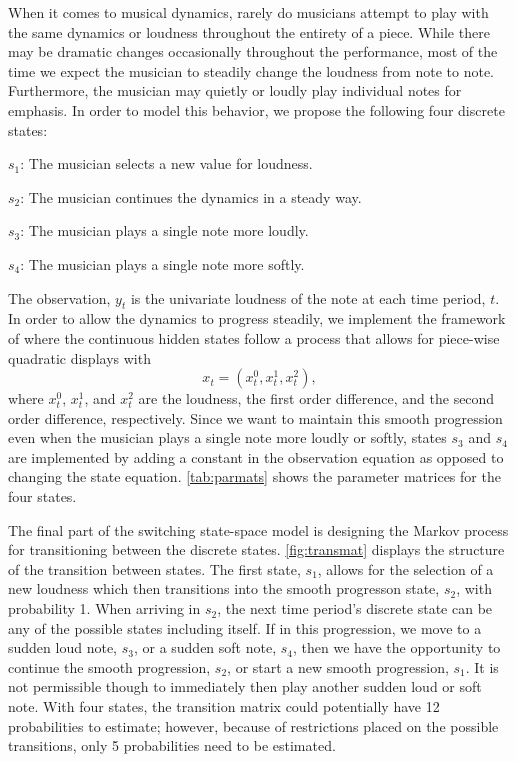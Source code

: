 \documentclass[12pt]{article}
\begin{document}
When it comes to musical dynamics, rarely do musicians attempt to play
with the same dynamics or loudness throughout the entirety of a piece.
While there may be dramatic changes occasionally throughout the
performance, most of the time we expect the musician to steadily change
the loudness from note to note. Furthermore, the musician may quietly or
loudly play individual notes for emphasis. In order to model this
behavior, we propose the following four discrete states:

\begin{list}{}{}

\item[$s_1$:] The musician selects a new value for loudness.

\item[$s_2$:] The musician continues the dynamics in a steady way.

\item[$s_3$:] The musician plays a single note more loudly.

\item[$s_4$:] The musician plays a single note more softly.

\end{list}

The observation, \(y_t\) is the univariate loudness of the note at each
time period, \(t\). In order to allow the dynamics to progress steadily,
we implement the framework of \citet{gu_modeling_2012} where the
continuous hidden states follow a process that allows for piece-wise
quadratic displays with \[x_t = (x^0_t, x^1_t, x^2_t), \] where
\(x^0_t\), \(x^1_t\), and \(x^2_t\) are the loudness, the first order
difference, and the second order difference, respectively. Since we want
to maintain this smooth progression even when the musician plays a
single note more loudly or softly, states \(s_3\) and \(s_4\) are
implemented by adding a constant in the observation equation as opposed
to changing the state equation. \autoref{tab:parmats} shows the
parameter matrices for the four states.

The final part of the switching state-space model is designing the
Markov process for transitioning between the discrete states.
\autoref{fig:transmat} displays the structure of the transition between
states. The first state, \(s_1\), allows for the selection of a new
loudness which then transitions into the smooth progresson state,
\(s_2\), with probability 1. When arriving in \(s_2\), the next time
period's discrete state can be any of the possible states including
itself. If in this progression, we move to a sudden loud note, \(s_3\),
or a sudden soft note, \(s_4\), then we have the opportunity to continue
the smooth progression, \(s_2\), or start a new smooth progression,
\(s_1\). It is not permissible though to immediately then play another
sudden loud or soft note. With four states, the transition matrix could
potentially have 12 probabilities to estimate; however, because of
restrictions placed on the possible transitions, only 5 probabilities
need to be estimated.
\end{document}
